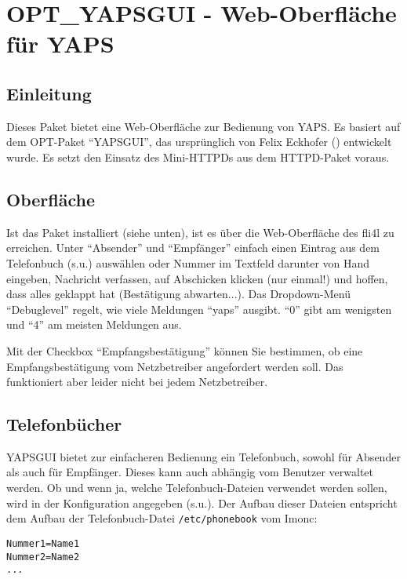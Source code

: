 \section {OPT\_YAPSGUI - Web-Oberfläche für YAPS}

\subsection {Einleitung}

Dieses Paket bietet eine Web-Oberfläche zur Bedienung von YAPS. Es basiert auf
dem OPT-Paket ``YAPSGUI'', das ursprünglich von Felix Eckhofer
() entwickelt wurde. Es setzt den Einsatz des
Mini-HTTPDs aus dem HTTPD-Paket voraus.

\subsection {Oberfläche}

Ist das Paket installiert (siehe unten), ist es über die Web-Oberfläche des
fli4l zu erreichen. Unter ``Absender'' und ``Empfänger'' einfach einen Eintrag
aus dem Telefonbuch (s.u.) auswählen oder Nummer im Textfeld darunter von Hand
eingeben, Nachricht verfassen, auf Abschicken klicken (nur einmal!) und
hoffen, dass alles geklappt hat (Bestätigung abwarten...). Das Dropdown-Menü
``Debuglevel'' regelt, wie viele Meldungen ``yaps'' ausgibt. ``0'' gibt am
wenigsten und ``4'' am meisten Meldungen aus.

Mit der Checkbox ``Empfangsbestätigung'' können Sie bestimmen, ob eine
Empfangsbestätigung vom Netzbetreiber angefordert werden soll. Das funktioniert
aber leider nicht bei jedem Netzbetreiber.

\subsection {Telefonbücher}

YAPSGUI bietet zur einfacheren Bedienung ein Telefonbuch, sowohl für
Absender als auch für Empfänger. Dieses kann auch abhängig vom Benutzer
verwaltet werden. Ob und wenn ja, welche Telefonbuch-Dateien verwendet werden
sollen, wird in der Konfiguration angegeben (s.u.). Der Aufbau dieser Dateien
entspricht dem Aufbau der Telefonbuch-Datei \texttt{/etc/phonebook} vom Imonc:

\begin{small}
\begin{example}
\begin{verbatim}
Nummer1=Name1
Nummer2=Name2
...
\end{verbatim}
\end{example}
\end{small}

